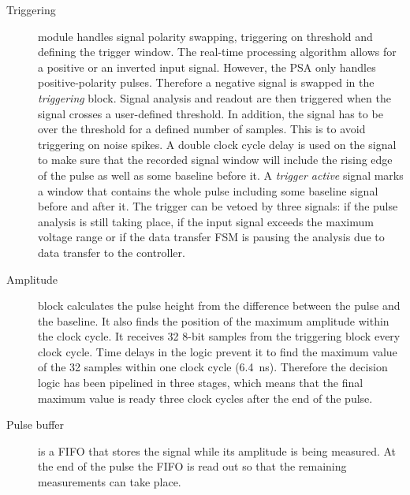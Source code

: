 \begin{description}
\item[Triggering] module handles signal polarity swapping, triggering on threshold and defining the trigger window. The real-time processing algorithm allows for a positive or an inverted input signal. However, the PSA only handles positive-polarity pulses. Therefore a negative signal is swapped in the \textit{triggering} block. Signal analysis and readout are then triggered when the signal crosses a user-defined threshold. In addition, the signal has to be over the threshold for a defined number of samples. This is to avoid triggering on noise spikes.
A double clock cycle delay is used on the signal to make sure that the recorded signal window will include the rising edge of the pulse as well as some baseline before it. A \textit{trigger active} signal marks a window that contains the whole pulse including some baseline signal before and after it. 
The trigger can be vetoed by three signals: if the pulse analysis is still taking place, if the input signal exceeds the maximum voltage range or if the data transfer FSM is pausing the analysis due to data transfer to the controller.

%


\item[Amplitude] block calculates the pulse height from the difference between the pulse and the baseline. It also finds the position of the maximum amplitude within the clock cycle. It receives 32 8-bit samples from the triggering block every clock cycle. Time delays in the logic prevent it to find the maximum value of the 32 samples within one clock cycle (6.4~ns). Therefore the decision logic has been pipelined in three stages, which means that the final maximum value is ready three clock cycles after the end of the pulse.
\item[Pulse buffer] is a FIFO that stores the signal while its amplitude is being measured. At the end of the pulse the FIFO is read out so that the remaining measurements can take place. 


\end{description}
